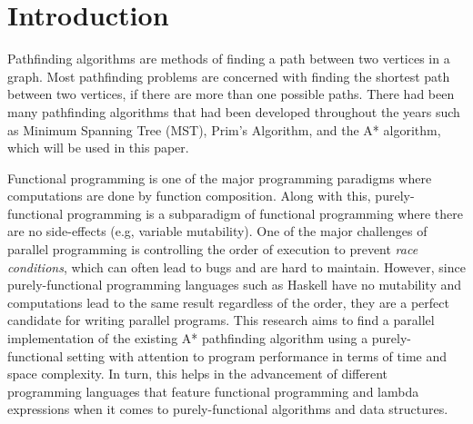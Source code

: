 \chapter{Introduction}

Pathfinding algorithms are methods of finding a path between two vertices in  
a graph. Most pathfinding problems are concerned with finding the shortest
path between two vertices, if there are more than one possible paths. There had 
been many pathfinding algorithms that had been developed throughout the years 
such as Minimum Spanning Tree (MST), Prim's Algorithm\cite{Prim1957}, and the A*
algorithm, which will be used in this paper.\cite{HartNilssonRaphael1968}

Functional programming is one of the major programming paradigms where computations 
are done by function composition. Along with this, purely-functional programming is 
a subparadigm of functional programming where there are no side-effects (e.g, variable mutability).
One of the major challenges of parallel programming is controlling the order of execution
to prevent \emph{race conditions}, which can often lead to bugs and are hard to maintain.
However, since purely-functional programming languages such as Haskell\cite{HaskellSite}
have no mutability and computations lead to the same result regardless of the order, they 
are a perfect candidate for writing parallel programs.\cite{Hammond2011} 
This research aims to find a parallel implementation of the existing A* pathfinding algorithm
using a purely-functional setting with attention to program performance in terms of time and space 
complexity. \cite{ZaghloulAlJami2017, WeinstockHolladay}
In turn, this helps in the advancement of different programming languages that feature 
functional programming and lambda expressions when it comes to purely-functional algorithms and data structures.





